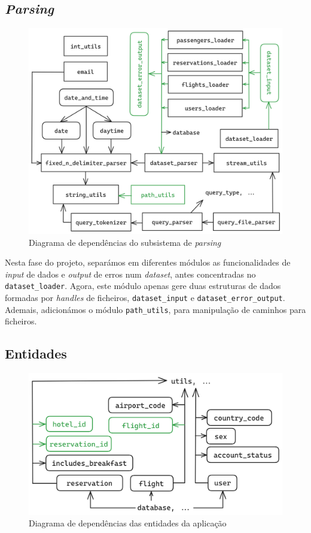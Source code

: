 \documentclass[12pt, a4paper]{article}
\begin{document}
\subsection{\emph{Parsing}}
\label{sec:parsing}

\begin{figure}[ht]
    \centering
    \includegraphics[scale=0.17]{res-fase2/parsing.png}
    \caption{Diagrama de dependências do subsistema de \emph{parsing}}
    \label{fig:parsing}
\end{figure}

Nesta fase do projeto, separámos em diferentes módulos as funcionalidades de \emph{input} de dados
e \emph{output} de erros num \emph{dataset}, antes concentradas no \texttt{dataset\_loader}. Agora,
este módulo apenas gere duas estruturas de dados formadas por \emph{handles} de ficheiros,
\texttt{dataset\_input} e \texttt{dataset\_error\_output}. Ademais, adicionámos o módulo
\texttt{path\_utils}, para manipulação de caminhos para ficheiros.

\subsection{Entidades}
\label{sec:entities}

\begin{figure}[ht]
    \centering
    \includegraphics[scale=0.2]{res-fase2/entities.png}
    \caption{Diagrama de dependências das entidades da aplicação}
    \label{fig:entities}
\end{figure}
\end{document}
